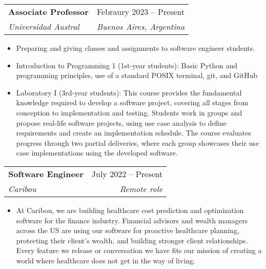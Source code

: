 \documentclass[letterpaper,11pt]{article}
\makeatletter
\newcommand{\resumeItem}[1]{
  \item\small{
    {#1 \vspace{-2pt}}
  }
}
\newcommand{\resumeSubheading}[4]{
  \vspace{-2pt}\item
    \begin{tabular*}{0.97\textwidth}[t]{l@{\extracolsep{\fill}}r}
      \textbf{#1} & #2 \\
      \textit{\small#3} & \textit{\small #4} \\
    \end{tabular*}\vspace{-7pt}
}
\newcommand{\resumeSubSubheading}[2]{
    \item
    \begin{tabular*}{0.97\textwidth}{l@{\extracolsep{\fill}}r}
      \textit{\small#1} & \textit{\small #2} \\
    \end{tabular*}\vspace{-7pt}
}
\newcommand{\resumeSubHeadingListEnd}{\end{itemize}}
\newcommand{\resumeItemListStart}{\begin{itemize}}
\newcommand{\resumeItemListEnd}{\end{itemize}\vspace{-5pt}}
\makeatother
\begin{document}
    \resumeSubheading
      {Associate Professor}{Febraury 2023 -- Present}
      {Universidad Austral}{Buenos Aires, Argentina}
      \resumeItemListStart
        \resumeItem{Preparing and giving classes and assignments to software engineer students.}
        \resumeItem{Introduction to Programming 1 (1st-year students): Basic Python and programming principles, use of a standard POSIX terminal, git, and GitHub}
        \resumeItem{Laboratory I (3rd-year students):
        This course provides the fundamental knowledge required to develop a software project, covering all stages from conception to implementation and testing. Students work in groups and propose real-life software projects, using use case analysis to define requirements and create an implementation schedule. The course evaluates progress through two partial deliveries, where each group showcases their use case implementations using the developed software.}
        \resumeItemListEnd
    \resumeSubheading
      {Software Engineer}{July 2022 -- Present}
      {Caribou}{Remote role}
      \resumeItemListStart
        \resumeItem{At Caribou, we are building healthcare cost prediction and optimization software for the finance industry. Financial advisors and wealth managers across the US are using our software for proactive healthcare planning, protecting their client’s wealth, and building stronger client relationships. Every feature we release or conversation we have fits our mission of creating a world where healthcare does not get in the way of living.}
      \resumeItemListEnd
      
\end{document}
